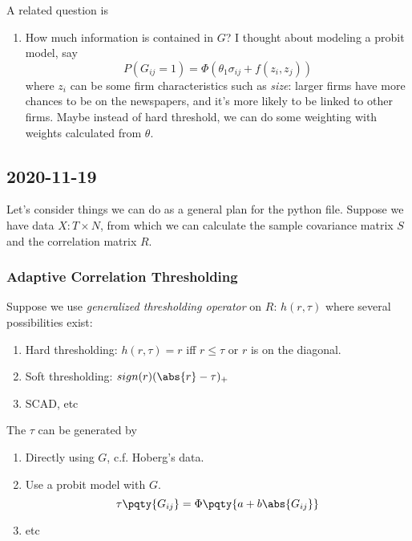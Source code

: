     \begin{question}
        A related question is
        \begin{enumerate}
            \item How much information is contained in \(G\)? I thought about modeling a probit model, say
            \begin{equation}
                P(G_{ij} =1) = \Phi(\theta_{1} \sigma_{ij} +  f(z_{i},z_{j}))
            \end{equation}
            where \(z_{i}\) can be some firm characteristics such as \textit{size}: larger firms have more chances to be on the newspapers, and it's more likely to be linked to other firms. Maybe instead of hard threshold, we can do some weighting with weights calculated from \(\theta\).
        \end{enumerate}
    \end{question}
    
    \subsection{2020-11-19}
        Let's consider things we can do as a general plan for the python file. Suppose we have data \(X: T\times N\), from which we can calculate the sample covariance matrix \(S\) and the correlation matrix \(R\). 

        \subsubsection{Adaptive Correlation Thresholding}
        Suppose we use \textit{generalized thresholding operator} on \(R\): \(h(r,\tau)\) where several possibilities exist:
        \begin{enumerate}
            \item Hard thresholding: \(h(r,\tau) = r\) iff \(r \leq \tau\) or \(r\) is on the diagonal. 
            \item Soft thresholding: \(sign(r)(\abs{r} - \tau)_{+} \)
            \item SCAD, etc
        \end{enumerate}
        
        The \(\tau\) can be generated by 
        \begin{enumerate}
            \item Directly using \(G\), c.f. Hoberg's data.
            \item Use a probit model with \(G\). 
            \begin{equation}
                \tau\pqty{G_{ij}} = \Phi\pqty{a + b \abs{G_{ij}}}
            \end{equation}
            \item etc
        \end{enumerate}
        
